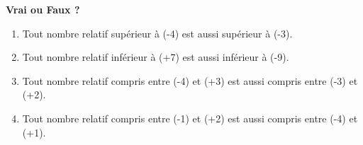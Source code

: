 \documentclass[exercice]{thedocument}%
\begin{document}
%
{\bfseries Vrai ou Faux ?}
\begin{enumerate}
    \item Tout nombre relatif supérieur à (-4) est aussi supérieur à (-3).
    \answerspace{1.5cm}
    \item Tout nombre relatif inférieur à (+7) est aussi inférieur à (-9).
    \answerspace{1.5cm}
    \item Tout nombre relatif compris entre (-4) et (+3) est aussi compris
    entre (-3) et (+2).
    \answerspace{1.5cm}
    \item Tout nombre relatif compris entre (-1) et (+2) est aussi compris entre (-4) et (+1).
    \answerspace{1.5cm}
\end{enumerate}
\end{document}
